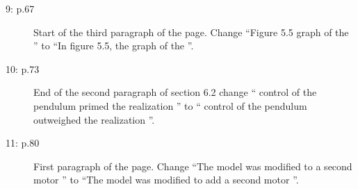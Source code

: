 \documentclass[12pt]{article}
\begin{document}
\begin{description}
        \item[9: p.67] Start of the third paragraph of the page. Change \enquote{Figure 5.5 graph of the \textelp{}} to \enquote{In figure 5.5, the graph of the \textelp{}}.
        
        \item[10: p.73] End of the second paragraph of section 6.2 change \enquote{\textelp{} control of the pendulum primed the realization \textelp{}} to \enquote{\textelp{} control of the pendulum outweighed the realization \textelp{}}.
        
        \item[11: p.80] First paragraph of the page. Change \enquote{The model was modified to a second motor \textelp{}} to \enquote{The model was modified to add a second motor \textelp{}}.
    \end{description} 

    
    
\end{document}
